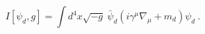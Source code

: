 \begin{equation}\label{1.9}
I[\psi_d, g]=\int d^4x \sqrt{-g}~ \bar{\psi}_d(i\gamma^\mu
\nabla_\mu+m_d)\psi_d~.
\end{equation}

